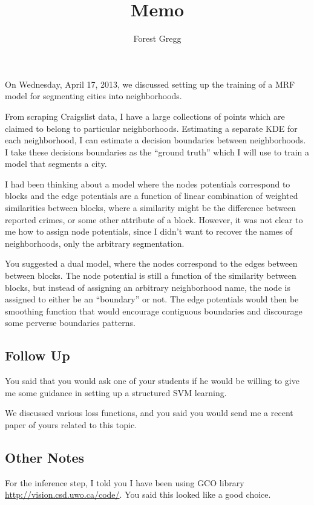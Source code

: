 \documentclass{article}
\title{Memo}
\author{Forest Gregg}
\begin{document}
\maketitle

On Wednesday, April 17, 2013, we discussed setting up the training of
a MRF model for segmenting cities into neighborhoods. 

From scraping Craigslist data, I have a large collections of points
which are claimed to belong to particular neighborhoods. Estimating a
separate KDE for each neighborhood, I can estimate a decision
boundaries between neighborhoods. I take these decisions boundaries as
the ``ground truth'' which I will use to train a model that segments a
city.

I had been thinking about a model where the nodes potentials
correspond to blocks and the edge potentials are a function of linear
combination of weighted similarities between blocks, where a
similarity might be the difference between reported crimes, or some
other attribute of a block.  However, it was not clear to me how to
assign node potentials, since I didn't want to recover the names of
neighborhoods, only the arbitrary segmentation.

You suggested a dual model, where the nodes correspond to the edges
between between blocks. The node potential is still a function of the
similarity between blocks, but instead of assigning an arbitrary
neighborhood name, the node is assigned to either be an ``boundary''
or not. The edge potentials would then be smoothing function that
would encourage contiguous boundaries and discourage some perverse
boundaries patterns.


\subsection*{Follow Up}

You said that you would ask one of your students if he would be
willing to give me some guidance in setting up a structured SVM
learning.

We discussed various loss functions, and you said you would send me a
recent paper of yours related to this topic.

\subsection*{Other Notes}
For the inference step, I told you I have been using GCO library
\url{http://vision.csd.uwo.ca/code/}. You said this looked like a good
choice.
\end{document}
